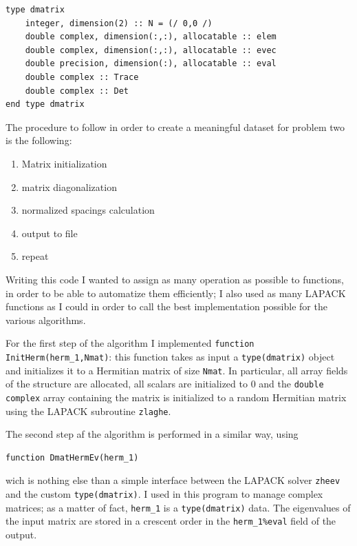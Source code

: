 \documentclass[a4paper]{article}
\begin{document}
\begin{lstlisting}
type dmatrix
    integer, dimension(2) :: N = (/ 0,0 /)
    double complex, dimension(:,:), allocatable :: elem
    double complex, dimension(:,:), allocatable :: evec
    double precision, dimension(:), allocatable :: eval
    double complex :: Trace
    double complex :: Det
end type dmatrix
\end{lstlisting}

The procedure to follow in order to create a meaningful dataset for problem two is the following:
\begin{enumerate}
    \item Matrix initialization
    \item matrix diagonalization
    \item normalized spacings calculation
    \item output to file 
    \item repeat
\end{enumerate}
Writing this code I wanted to assign as many operation as possible to functions, in order to be able to automatize them efficiently; I also used as many LAPACK functions as I could in order to call the best implementation possible for the various algorithms.

For the first step of the algorithm I implemented \lstinline{function InitHerm(herm_1,Nmat)}: this function takes as input a \lstinline{type(dmatrix)} object and initializes it to a Hermitian matrix of size \lstinline{Nmat}.
In particular, all array fields of the structure are allocated, all scalars are initialized to 0 and the \lstinline{double complex} array containing the matrix is initialized to a random Hermitian matrix using the LAPACK subroutine \lstinline{zlaghe}.

The second step af the algorithm is performed in a similar way, using
\begin{lstlisting}
function DmatHermEv(herm_1)
\end{lstlisting}
wich is nothing else than a simple interface between the LAPACK solver \lstinline{zheev} and the custom \lstinline{type(dmatrix)}. I used in this program to manage complex matrices; as a matter of fact, \lstinline{herm_1} is a \lstinline{type(dmatrix)} data.
The eigenvalues of the input matrix are stored in a crescent order in the \lstinline{herm_1%eval} field of the output.
\end{document}
